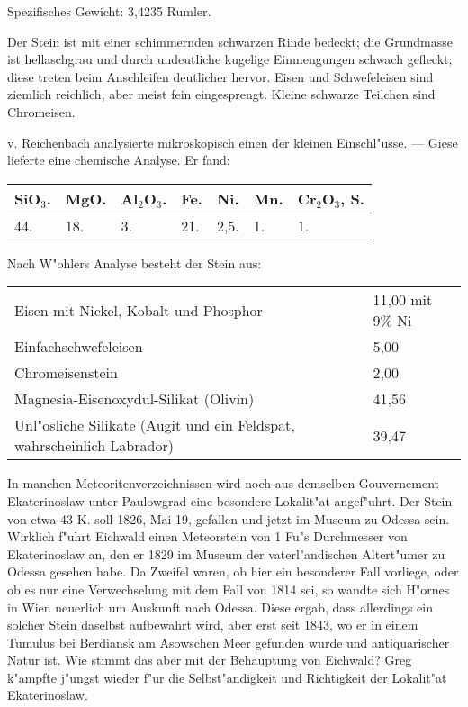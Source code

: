 \documentclass[a4paper, 11pt, oneside]{article}
\begin{document}
Spezifisches Gewicht: 3,4235 Rumler.

Der Stein ist mit einer schimmernden schwarzen Rinde bedeckt; die Grundmasse ist hellaschgrau und durch undeutliche kugelige Einmengungen schwach gefleckt; diese treten beim Anschleifen deutlicher hervor. Eisen und Schwefeleisen sind ziemlich reichlich, aber meist fein eingesprengt. Kleine schwarze Teilchen sind Chromeisen.

v. Reichenbach analysierte mikroskopisch einen der kleinen Einschl"usse. --- Giese lieferte eine chemische Analyse. Er fand:
\begin{table}[!ht]
    \centering\swabfamily\Large
    \begin{tabular}{l l l l l l l}
        SiO$_{3}$. & MgO. & Al$_{2}$O$_{3}$. & Fe. & Ni. & Mn. & Cr$_{2}$O$_{3}$, S. \\ \hline
        44. & 18. & 3. & 21. & 2,5. & 1. & 1. \\
    \end{tabular}
\end{table}

Nach W"ohlers Analyse besteht der Stein aus:
\begin{table}[!ht]
    \centering\swabfamily\Large
    \begin{tabular}{p{75mm} l}
        Eisen mit Nickel, Kobalt und Phosphor & 11,00 mit 9\% Ni \\
        Einfachschwefeleisen & 5,00 \\
        Chromeisenstein & 2,00 \\
        Magnesia-Eisenoxydul-Silikat (Olivin) & 41,56 \\
        Unl"osliche Silikate (Augit und ein Feldspat, wahrscheinlich Labrador) & 39,47 \\
    \end{tabular}
\end{table}

In manchen Meteoritenverzeichnissen wird noch aus demselben Gouvernement Ekaterinoslaw unter Paulowgrad eine besondere Lokalit"at angef"uhrt. Der Stein von etwa 43 K. soll 1826, Mai 19, gefallen und jetzt im Museum zu Odessa sein. Wirklich f"uhrt Eichwald einen Meteorstein von 1 Fu"s Durchmesser von Ekaterinoslaw an, den er 1829 im Museum der vaterl"andischen Altert"umer zu Odessa gesehen habe. Da Zweifel waren, ob hier ein besonderer Fall vorliege, oder ob es nur eine Verwechselung mit dem Fall von 1814 sei, so wandte sich H"ornes in Wien neuerlich um Auskunft nach Odessa. Diese ergab, dass allerdings ein solcher Stein daselbst aufbewahrt wird, aber erst seit 1843, wo er in einem Tumulus bei Berdiansk am Asowschen Meer gefunden wurde und antiquarischer Natur ist. Wie stimmt das aber mit der Behauptung von Eichwald? Greg k"ampfte j"ungst wieder f"ur die Selbst"andigkeit und Richtigkeit der Lokalit"at Ekaterinoslaw.
\end{document}
